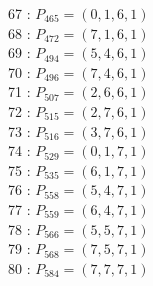 \documentclass{article}
\begin{document}
{\begin{multicols}{3}
67 : $P_{465}=( 0, 1, 6, 1 )$\\
68 : $P_{472}=( 7, 1, 6, 1 )$\\
69 : $P_{494}=( 5, 4, 6, 1 )$\\
70 : $P_{496}=( 7, 4, 6, 1 )$\\
71 : $P_{507}=( 2, 6, 6, 1 )$\\
72 : $P_{515}=( 2, 7, 6, 1 )$\\
73 : $P_{516}=( 3, 7, 6, 1 )$\\
74 : $P_{529}=( 0, 1, 7, 1 )$\\
75 : $P_{535}=( 6, 1, 7, 1 )$\\
76 : $P_{558}=( 5, 4, 7, 1 )$\\
77 : $P_{559}=( 6, 4, 7, 1 )$\\
78 : $P_{566}=( 5, 5, 7, 1 )$\\
79 : $P_{568}=( 7, 5, 7, 1 )$\\
80 : $P_{584}=( 7, 7, 7, 1 )$\\
\end{multicols}


%


%


}%
\end{document}
